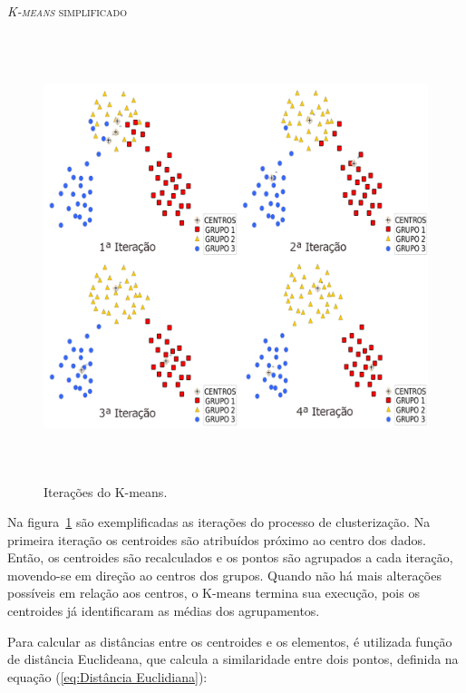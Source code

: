 \begin{algorithm}[H]
\label{alg1}
\caption{\textsc{\textit{K-means} simplificado}}
\end{algorithm}
\vspace{0.4cm}

\begin{figure}[!h]
\centering
\includegraphics[width = 15cm, height = 13cm]{figuras/kmeans.png}
\caption{\scriptsize{Iterações do K-means.}}
\label{fig1K}
\end{figure}

\indent Na figura~\ref{fig1K} são exemplificadas as iterações do processo de clusterização. Na primeira iteração os centroides são atribuídos próximo ao centro dos dados. Então, os centroides são recalculados e os pontos são agrupados a cada iteração, movendo-se em direção ao centros dos grupos. Quando não há mais alterações possíveis em relação aos centros, o K-means termina sua execução, pois os centroides já identificaram as médias dos agrupamentos.

\indent Para calcular as distâncias entre os centroides e os elementos, é utilizada função de distância Euclideana, que calcula a similaridade entre dois pontos,  definida na equação (\ref{eq:Distância Euclidiana}):

